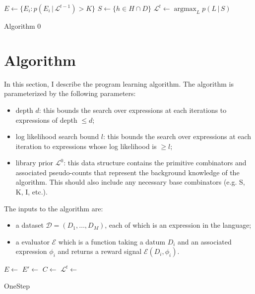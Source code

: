 \documentclass{article}
\DeclareMathOperator*{\argmax}{argmax}
\begin{document}
\begin{minipage}{.7\linewidth}
  \begin{algorithm}[H]
    \SetAlgoLined 
    $E \leftarrow \{ E_i : p(E_i\, |\, \mathcal{L}^{t-1}) > K\}$\;
    $S \leftarrow \{ h \in H \cap D \}$\;
    $\mathcal{L}^t \leftarrow \argmax_L p(L \, | \, S)$
    \caption{Algorithm 0}
    \label{alg:short}
  \end{algorithm}
\end{minipage}


\section{Algorithm}
In this section, I describe the program learning algorithm. The
algorithm is parameterized by the following parameters: 

\begin{itemize}
\item depth $d$: this bounds the search over expressions at each
  iterations to expressions of depth $\leq d$;
\item log likelihood search bound $l$: this bounds the search over
  expressions at each iteration to expressions whose log likelihood is
  $\geq l$;
\item library prior $\mathcal{L}^0$: this data structure contains the
  primitive combinators and associated pseudo-counts that represent
  the background knowledge of the algorithm. This should also include
  any necessary base combinators (e.g. S, K, I, etc.).
\end{itemize}

The inputs to the algorithm are:
\begin{itemize}
\item a dataset $\mathcal{D} = (D_1, \dots, D_M)$, each of which is an
  expression in the language;
\item a evaluator $\mathcal{E}$ which is a function taking a datum
  $D_i$ and an associated expression $\phi_i$ and returns a reward
  signal $\mathcal{E}(D_i, \phi_i)$.
\end{itemize}

\begin{minipage}{.7\linewidth}
  \begin{algorithm}[H]
    \SetAlgoLined 
    $E \leftarrow $ \;
    $E' \leftarrow $ 
      \;
    $C \leftarrow$ \;
    $\mathcal{L}^t \leftarrow$ \;
    \caption{OneStep}
  \end{algorithm}
\end{minipage}
\end{document}
